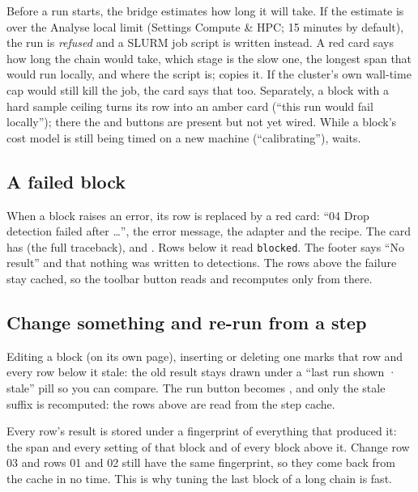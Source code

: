 \begin{watchout}
Before a run starts, the bridge estimates how long it will take. If the estimate is over the
Analyse local limit (Settings \textrightarrow{} Compute \& HPC; 15 minutes by default), the run
is \emph{refused} and a SLURM job script is written instead. A red card says how long the chain
would take, which stage is the slow one, the longest span that would run locally, and where the
script is;  copies it. If the cluster's own wall-time cap would still kill the
job, the card says that too. Separately, a block with a hard sample ceiling turns its row into an
amber card (``this run would fail locally''); there the  and
 buttons are present but not yet wired. While a block's cost model is
still being timed on a new machine (``calibrating''),  waits.
\end{watchout}

\subsection*{A failed block}
When a block raises an error, its row is replaced by a red card: ``04 Drop detection failed after
\ldots'', the error message, the adapter and the recipe. The card has  (the full
traceback),  and . Rows below it read \texttt{blocked}. The footer
says ``No result'' and that nothing was written to detections. The rows above the failure stay
cached, so the toolbar button reads  and recomputes only from there.


\subsection*{Change something and re-run from a step}
Editing a block (on its own page), inserting or deleting one marks that row and every row below
it stale: the old result stays drawn under a ``last run shown · stale'' pill so you can compare.
The run button becomes , and only the stale suffix is recomputed: the rows
above are read from the step cache.

\begin{plainterms}
Every row's result is stored under a fingerprint of everything that produced it: the span and
every setting of that block and of every block above it. Change row 03 and rows 01 and 02 still
have the same fingerprint, so they come back from the cache in no time. This is why tuning the
last block of a long chain is fast.
\end{plainterms}

